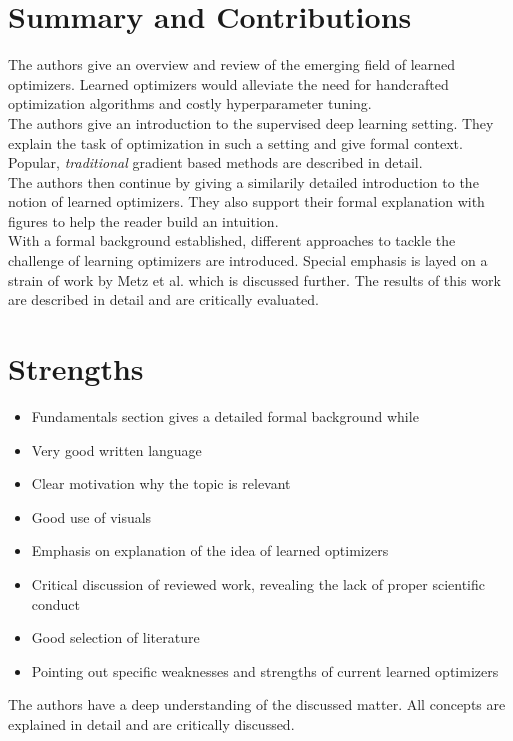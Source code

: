\documentclass[a4paper]{scrartcl}
\begin{document}
	
\section*{Summary and Contributions}
The authors give an overview and review of the emerging field of learned optimizers. Learned optimizers would alleviate the need for handcrafted optimization algorithms and costly hyperparameter tuning.\\
The authors give an introduction to the supervised deep learning setting. They explain the task of optimization in such a setting and give formal context. Popular, \textit{traditional} gradient based methods are described in detail.\\
The authors then continue by giving a similarily detailed introduction to the notion of learned optimizers. They also support their formal explanation with figures to help the reader build an intuition. \\
With a formal background established, different approaches to tackle the challenge of learning optimizers are introduced. Special emphasis is layed on a strain of work by Metz et al. which is discussed further. The results of this work are described in detail and are critically evaluated.


\section*{Strengths}
\begin{itemize}
	\item Fundamentals section gives a detailed formal background while
	\item Very good written language
	\item Clear motivation why the topic is relevant
	\item Good use of visuals
	\item Emphasis on explanation of the idea of learned optimizers
	\item Critical discussion of reviewed work, revealing the lack of proper scientific conduct
	\item Good selection of literature
	\item Pointing out specific weaknesses and strengths of current learned optimizers
\end{itemize}



The authors have a deep understanding of the discussed matter. All concepts are explained in detail and are critically discussed.
\end{document}
